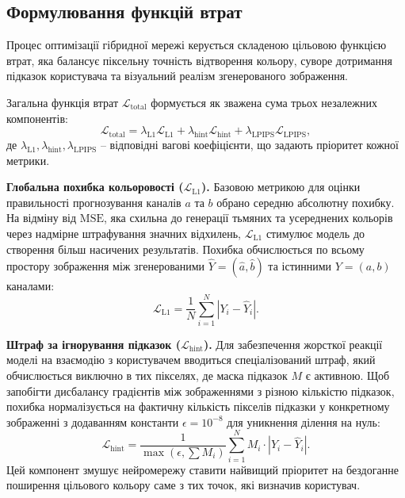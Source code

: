         \subsection{Формулювання функцій втрат}
            Процес оптимізації гібридної мережі керується складеною цільовою функцією втрат,
            яка балансує піксельну точність відтворення кольору,
            суворе дотримання підказок користувача та візуальний реалізм згенерованого зображення. 
            
            Загальна функція втрат $\mathcal{L}_{\mathrm{total}}$ формується як зважена сума трьох незалежних компонентів:
            \begin{equation*}
                \mathcal{L}_{\mathrm{total}} = \lambda_{\mathrm{L1}} \mathcal{L}_{\mathrm{L1}} + \lambda_{\mathrm{hint}} \mathcal{L}_{\mathrm{hint}} + \lambda_{\mathrm{LPIPS}} \mathcal{L}_{\mathrm{LPIPS}},
            \end{equation*}
            де $\lambda_{\mathrm{L1}}, \lambda_{\mathrm{hint}}, \lambda_{\mathrm{LPIPS}}$ -- відповідні вагові коефіцієнти, що задають пріоритет кожної метрики.

                \textbf{Глобальна похибка кольоровості ($\mathcal{L}_{\mathrm{L1}}$).}
                Базовою метрикою для оцінки правильності прогнозування каналів $a$ та $b$ обрано середню абсолютну похибку.
                На відміну від $\mathrm{MSE}$, яка схильна до генерації тьмяних та усереднених кольорів через надмірне штрафування значних відхилень, $\mathcal{L}_{\mathrm{L1}}$ стимулює модель до створення більш насичених результатів.
                Похибка обчислюється по всьому простору зображення між згенерованими $\hat{Y} = (\hat{a}, \hat{b})$ та істинними $Y = (a, b)$ каналами:
                \begin{equation*}
                    \mathcal{L}_{\mathrm{L1}} = \frac{1}{N} \sum_{i=1}^{N} | Y_i - \hat{Y}_i |.
                \end{equation*}

                \textbf{Штраф за ігнорування підказок ($\mathcal{L}_{\mathrm{hint}}$).}
                Для забезпечення жорсткої реакції моделі на взаємодію з користувачем вводиться спеціалізований штраф, який обчислюється виключно в тих пікселях, де маска підказок $M$ є активною.
                Щоб запобігти дисбалансу градієнтів між зображеннями з різною кількістю підказок, похибка нормалізується на фактичну кількість пікселів підказки у конкретному зображенні з додаванням константи $\epsilon = 10^{-8}$ для уникнення ділення на нуль:
                \begin{equation*}
                    \mathcal{L}_{\mathrm{hint}} = \frac{1}{\max\left(\epsilon, \sum M_i\right)} \sum_{i=1}^{N} M_i \cdot | Y_i - \hat{Y}_i |.
                \end{equation*}
                Цей компонент змушує нейромережу ставити найвищий пріоритет на бездоганне поширення цільового кольору саме з тих точок, які визначив користувач.

